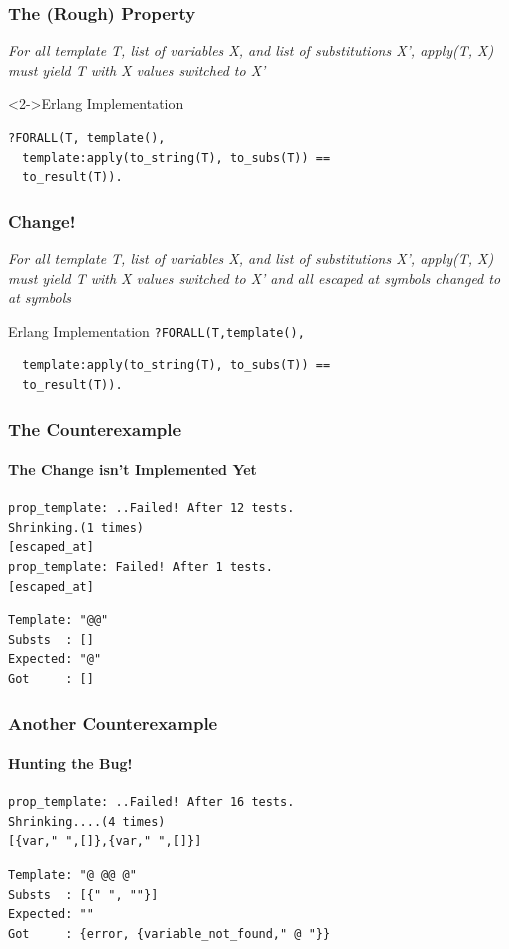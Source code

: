 \documentclass[xcolor=dvipsnames]{beamer}
\begin{document}
\begin{frame}[fragile]
  \frametitle{The (Rough) Property}

  \begin{center}
    \textit{ For all template T, list of variables X, and list of
      substitutions X', apply(T, X) must yield T with X values
      switched to X'}
  \end{center}

  \begin{block}<2->{Erlang Implementation}
\begin{verbatim}
?FORALL(T, template(),
  template:apply(to_string(T), to_subs(T)) ==
  to_result(T)).
\end{verbatim}
  \end{block}
\end{frame}

\begin{frame}[fragile]
  \frametitle{Change!}

  \begin{center}
    \textit{ For all template T, list of variables X, and list of
      substitutions X', apply(T, X) must yield T with X values
      switched to X' \alert{and all escaped at symbols changed to at
        symbols}}
  \end{center}

  \begin{block}{Erlang Implementation}
\verb+?FORALL(T,+\alert{\texttt{template(),}}
\begin{verbatim}
  template:apply(to_string(T), to_subs(T)) ==
  to_result(T)).
\end{verbatim}
  \end{block}
\end{frame}

\begin{frame}[fragile]
  \frametitle{The Counterexample}
  \framesubtitle{The Change isn't Implemented Yet}

\begin{verbatim}
prop_template: ..Failed! After 12 tests.
Shrinking.(1 times)
[escaped_at]
prop_template: Failed! After 1 tests.
[escaped_at]
\end{verbatim}
  {\color{red}
\begin{verbatim}
Template: "@@"
Substs  : []
Expected: "@"
Got     : []
\end{verbatim}
}
\end{frame}

\begin{frame}[fragile]
  \frametitle{Another Counterexample}
  \framesubtitle{Hunting the Bug!}

\begin{verbatim}
prop_template: ..Failed! After 16 tests.
Shrinking....(4 times)
[{var," ",[]},{var," ",[]}]
\end{verbatim}
  {\color{red}
\begin{verbatim}
Template: "@ @@ @"
Substs  : [{" ", ""}]
Expected: ""
Got     : {error, {variable_not_found," @ "}}
\end{verbatim}
}
\end{frame}
\end{document}
